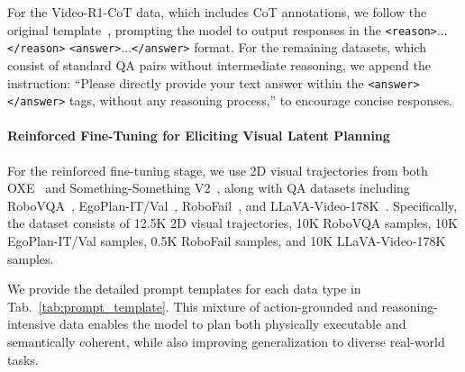 For the Video-R1-CoT data, which includes CoT annotations, we follow the original template~\cite{feng2025video}, prompting the model to output responses in the \texttt{<reason>}...\texttt{</reason>} \texttt{<answer>}...\texttt{</answer>} format. For the remaining datasets, which consist of standard QA pairs without intermediate reasoning, we append the instruction: ``Please directly provide your text answer within the \texttt{<answer>} \texttt{</answer>} tags, without any reasoning process,'' to encourage concise responses.


\paragraph{Reinforced Fine-Tuning for Eliciting Visual Latent Planning} For the reinforced fine-tuning stage, we use 2D visual trajectories from both OXE~\cite{o2024open} and Something-Something V2~\cite{goyal2017something}, along with QA datasets including RoboVQA~\cite{sermanet2024robovqa}, EgoPlan-IT/Val~\cite{chen2023egoplan}, RoboFail~\cite{liu2023reflect}, and LLaVA-Video-178K~\cite{li2024llava}. Specifically, the dataset consists of 12.5K 2D visual trajectories, 10K RoboVQA samples, 10K EgoPlan-IT/Val samples, 0.5K RoboFail samples, and 10K LLaVA-Video-178K samples.

We provide the detailed prompt templates for each data type in Tab.~\ref{tab:prompt_template}. This mixture of action-grounded and reasoning-intensive data enables the model to plan both physically executable and semantically coherent, while also improving generalization to diverse real-world tasks.


